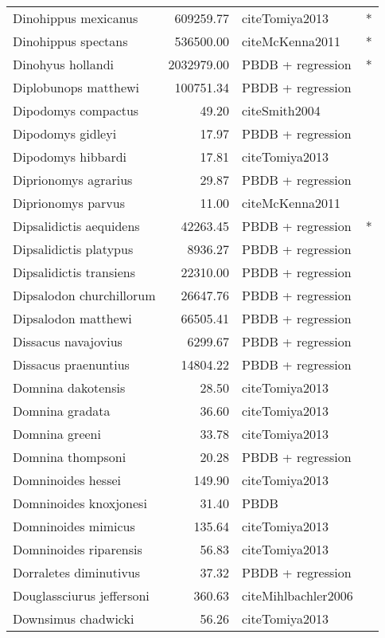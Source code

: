 \begin{table}[ht]
\begin{tabular}{lrll}
  Dinohippus mexicanus & 609259.77 & cite{Tomiya2013} & * \\ 
  Dinohippus spectans & 536500.00 & cite{McKenna2011} & * \\ 
  Dinohyus hollandi & 2032979.00 & PBDB + regression & * \\ 
  Diplobunops matthewi & 100751.34 & PBDB + regression &  \\ 
  Dipodomys compactus & 49.20 & cite{Smith2004} &  \\ 
  Dipodomys gidleyi & 17.97 & PBDB + regression &  \\ 
  Dipodomys hibbardi & 17.81 & cite{Tomiya2013} &  \\ 
  Diprionomys agrarius & 29.87 & PBDB + regression &  \\ 
  Diprionomys parvus & 11.00 & cite{McKenna2011} &  \\ 
  Dipsalidictis aequidens & 42263.45 & PBDB + regression & * \\ 
  Dipsalidictis platypus & 8936.27 & PBDB + regression &  \\ 
  Dipsalidictis transiens & 22310.00 & PBDB + regression &  \\ 
  Dipsalodon churchillorum & 26647.76 & PBDB + regression &  \\ 
  Dipsalodon matthewi & 66505.41 & PBDB + regression &  \\ 
  Dissacus navajovius & 6299.67 & PBDB + regression &  \\ 
  Dissacus praenuntius & 14804.22 & PBDB + regression &  \\ 
  Domnina dakotensis & 28.50 & cite{Tomiya2013} &  \\ 
  Domnina gradata & 36.60 & cite{Tomiya2013} &  \\ 
  Domnina greeni & 33.78 & cite{Tomiya2013} &  \\ 
  Domnina thompsoni & 20.28 & PBDB + regression &  \\ 
  Domninoides hessei & 149.90 & cite{Tomiya2013} &  \\ 
  Domninoides knoxjonesi & 31.40 & PBDB &  \\ 
  Domninoides mimicus & 135.64 & cite{Tomiya2013} &  \\ 
  Domninoides riparensis & 56.83 & cite{Tomiya2013} &  \\ 
  Dorraletes diminutivus & 37.32 & PBDB + regression &  \\ 
  Douglassciurus jeffersoni & 360.63 & cite{Mihlbachler2006} &  \\ 
  Downsimus chadwicki & 56.26 & cite{Tomiya2013} &  \\ 

\end{tabular}
\end{table}
